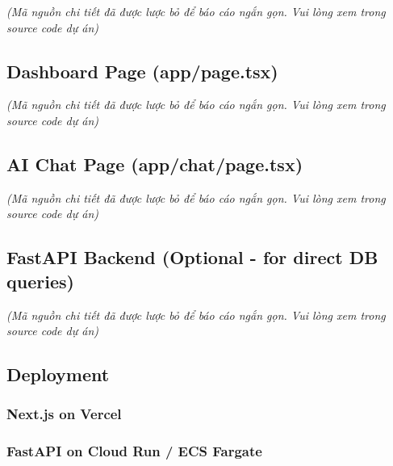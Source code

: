 \emph{(Mã nguồn chi tiết đã được lược bỏ để báo cáo ngắn gọn. Vui lòng
xem trong source code dự án)}

\hypertarget{dashboard-page-apppage.tsx}{%
\subsection{Dashboard Page
(app/page.tsx)}}

\emph{(Mã nguồn chi tiết đã được lược bỏ để báo cáo ngắn gọn. Vui lòng
xem trong source code dự án)}

\hypertarget{ai-chat-page-appchatpage.tsx}{%
\subsection{AI Chat Page
(app/chat/page.tsx)}}

\emph{(Mã nguồn chi tiết đã được lược bỏ để báo cáo ngắn gọn. Vui lòng
xem trong source code dự án)}

\hypertarget{fastapi-backend-optional---for-direct-db-queries}{%
\subsection{FastAPI Backend (Optional - for direct DB
queries)}}

\emph{(Mã nguồn chi tiết đã được lược bỏ để báo cáo ngắn gọn. Vui lòng
xem trong source code dự án)}

\hypertarget{deployment}{%
\subsection{Deployment}}

\hypertarget{next.js-on-vercel}{%
\subsubsection{Next.js on Vercel}}

\begin{Shaded}
\begin{Highlighting}[]
\end{Highlighting}
\end{Shaded}

\hypertarget{fastapi-on-cloud-run-ecs-fargate}{%
\subsubsection{FastAPI on Cloud Run / ECS
Fargate}}

